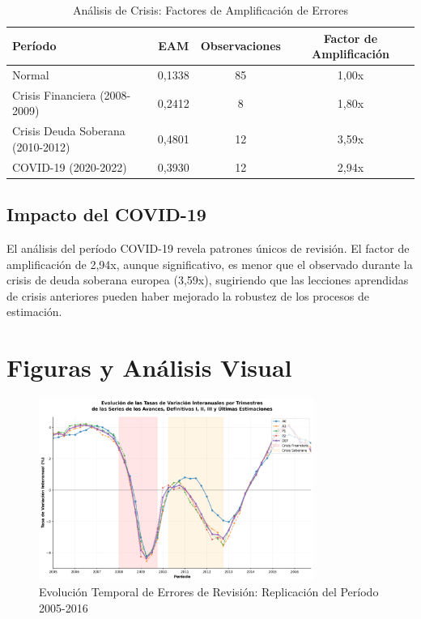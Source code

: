 \documentclass[12pt,a4paper]{article}
\begin{document}
\begin{table}[h]
\centering
\caption{Análisis de Crisis: Factores de Amplificación de Errores}
\label{tab:crisis_analysis}
\begin{tabular}{lccc}
\toprule
\textbf{Período} & \textbf{EAM} & \textbf{Observaciones} & \textbf{Factor de Amplificación} \\
\midrule
Normal & 0,1338 & 85 & 1,00x \\
Crisis Financiera (2008-2009) & 0,2412 & 8 & 1,80x \\
Crisis Deuda Soberana (2010-2012) & 0,4801 & 12 & 3,59x \\
COVID-19 (2020-2022) & 0,3930 & 12 & 2,94x \\
\bottomrule
\end{tabular}
\end{table}

\subsection{Impacto del COVID-19}

El análisis del período COVID-19 revela patrones únicos de revisión. El factor de amplificación de 2,94x, aunque significativo, es menor que el observado durante la crisis de deuda soberana europea (3,59x), sugiriendo que las lecciones aprendidas de crisis anteriores pueden haber mejorado la robustez de los procesos de estimación.

\section{Figuras y Análisis Visual}

\begin{figure}[h]
\centering
\includegraphics[width=0.8\textwidth]{../figuras/figura_2_pavia_robusta_2005_2016.png}
\caption{Evolución Temporal de Errores de Revisión: Replicación del Período 2005-2016}
\label{fig:evolucion_2005_2016}
\end{figure}
\end{document}
